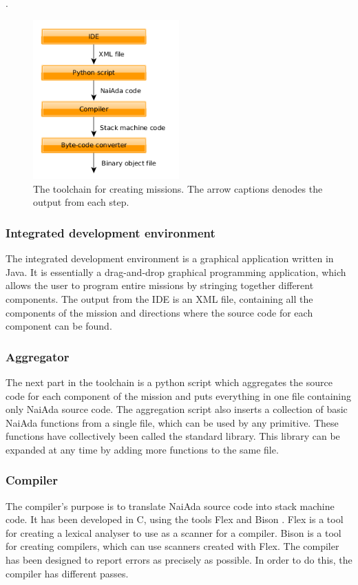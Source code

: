 \pageref{fig:another_column_figure}.
\begin{figure}[h]
    \includegraphics[width=0.5\textwidth]{./figure/figureMissionCreationToolchain.png}
    \caption{The toolchain for creating missions. The arrow captions denodes the output from each step.}
    \label{fig:another_column_figure}
\end{figure}


\subsubsection{Integrated development environment}
The integrated development environment is a graphical application written in Java. It is essentially a drag-and-drop graphical programming application, which allows the user to program entire missions by stringing together different components. The output from the IDE is an XML file, containing all the components of the mission and directions where the source code for each component can be found.

\subsubsection{Aggregator}
The next part in the toolchain is a python script which aggregates the source code for each component of the mission and puts everything in one file containing only NaiAda source code. The aggregation script also inserts a collection of basic NaiAda functions from a single file, which can be used by any primitive. These functions have collectively been called the standard library. This library can be expanded at any time by adding more functions to the same file.

\subsubsection{Compiler}
The compiler's purpose is to translate NaiAda source code into stack machine code. It has been developed in C, using the tools Flex \cite{web:mcsflex} and Bison \cite{web:mcsbison}. Flex is a tool for creating a lexical analyser to use as a scanner for a compiler. Bison is a tool for creating compilers, which can use scanners created with Flex. The compiler has been designed to report errors as precisely as possible. In order to do this, the compiler has different passes.

